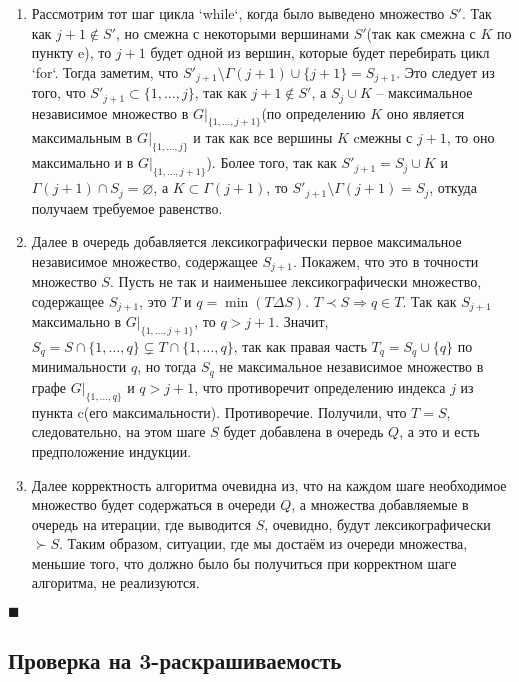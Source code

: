 \documentclass{article}
\begin{document}
\begin{enumerate}
\begin{enumerate}
\item Рассмотрим тот шаг цикла `while`, когда было выведено множество $S'$. Так как $j + 1\not\in S'$, но смежна с некоторыми вершинами $S'$(так как смежна с $K$ по пункту e), то $j + 1$ будет
одной из вершин, которые будет перебирать цикл `for`. Тогда заметим, что $S'_{j + 1}\setminus \Gamma(j + 1) \cup \{j + 1\} = S_{j + 1}$. Это следует из того, что $S'_{j + 1} \subset \{1, \hdots, j\}$,
так как $j + 1\not\in S'$, а $S_j\cup K$ -- максимальное независимое множество в $G|_{\{1, \hdots, j + 1\}}$(по определению $K$ оно является максимальным
в $G|_{\{1, \hdots, j\}}$ и так как все вершины $K$ cмежны с $j + 1$, то оно максимально и в $G|_{\{1, \hdots, j + 1\}}$). Более того, так как $S'_{j + 1} = S_j\cup K$ и $\Gamma(j + 1)\cap S_j = \varnothing$,
а $K\subset \Gamma(j + 1)$, то $S'_{j + 1}\setminus\Gamma(j + 1) = S_j$, откуда получаем требуемое равенство.
\item Далее в очередь добавляется лексикографически первое максимальное независимое множество, содержащее $S_{j + 1}$. Покажем, что это в точности множество $S$. Пусть не так и наименьшее
лексикографически множество, содержащее $S_{j + 1}$, это $T$ и $q = \min(T\Delta S)$. $T\prec S\Rightarrow q\in T$. Так как $S_{j + 1}$ максимально в $G|_{\{1, \hdots, j + 1\}}$, то $q > j + 1$. Значит,
$S_q = S\cap\{1, \hdots, q\}\subsetneq T\cap\{1, \hdots, q\}$, так как правая часть $T_q = S_q\cup\{q\}$ по минимальности $q$, но тогда $S_q$ не максимальное независимое множество в графе
$G|_{\{1, \hdots, q\}}$ и $q > j + 1$, что противоречит определению индекса $j$ из пункта c(его максимальности). Противоречие. Получили, что $T=S$, следовательно, на этом
шаге $S$ будет добавлена в очередь $Q$, а это и есть предположение индукции.
\item Далее корректность алгоритма очевидна из, что на каждом шаге необходимое множество будет содержаться в очереди $Q$, а множества добавляемые в очередь на итерации, где выводится $S$, очевидно, будут
лексикографически $\succ S$. Таким образом, ситуации, где мы достаём из очереди множества, меньшие того, что должно было бы получиться при корректном шаге алгоритма, не реализуются.
\end{enumerate}
\end{enumerate}
\begin{flushright} $\blacksquare$ \end{flushright}

\setcounter{section}{3}
\setcounter{subsection}{0}

\subsection{Проверка на 3-раскрашиваемость}
\end{document}
